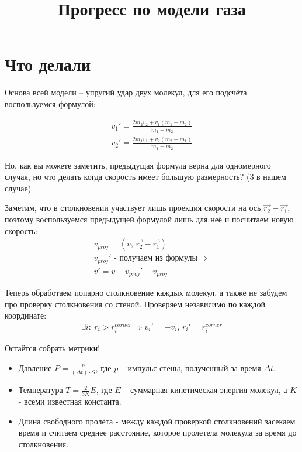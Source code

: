 \documentclass{beamer}
\title{Прогресс по модели газа}
\begin{document}
\begin{frame}
  \titlepage
\end{frame}

\section{Что делали}

\begin{frame}[fragile]
  Основа всей модели -- упругий удар двух молекул, для его подсчёта воспользуемся формулой:
  
    \begin{align*}
        v_1' = \frac{2m_2v_2 + v_1(m_1 - m_2)}{m_1 + m_2}\\
        v_2' = \frac{2m_1v_1 + v_2(m_2 - m_1)}{m_1 + m_2}
    \end{align*}
\end{frame}

\begin{frame}[fragile]
  Но, как вы можете заметить, предыдущая формула верна для одномерного случая, но что делать когда скорость имеет большую размерность? (3 в нашем случае)

  Заметим, что в столкновении участвует лишь проекция скорости на ось $\vec{r_2} - \vec{r_1}$, поэтому воспользуемся предыдущей формулой лишь для неё и посчитаем новую скорость:
  \begin{align*}
      v_{proj} = (v,\, \vec{r_2} - \vec{r_1})\\
      v_{proj}' \text{ - получаем из формулы} \Rightarrow\\
      v' = v + v_{proj}' - v_{proj}
  \end{align*}
\end{frame}

\begin{frame}[fragile]
    Теперь обработаем попарно столкновение каждых молекул, а также не забудем про проверку столкновения со стеной. Проверяем независимо по каждой координате:
    \begin{align*}
        \exists i :\: r_i > r_i^{corner} \Rightarrow v_i' = -v_i,\, r_i' = r_i^{corner} 
    \end{align*}
\end{frame}

\begin{frame}[fragile]
    Остаётся собрать метрики!
    \begin{itemize}
        \item<1-> Давление $P = \frac{p}{(\Delta t)\cdot S}$, где $p$ -- импульс стены, полученный за время $\Delta t$.
        \item <2-> Температура $T = \frac{2}{3K}E$, где $E$ -- суммарная кинетическая энергия молекул, а $K$ - всеми известная константа.
        \item <3-> Длина свободного пролёта - между каждой проверкой столкновений засекаем время и считаем среднее расстояние, которое пролетела молекула за время до столкновения.
    \end{itemize}
\end{frame}
\end{document}
